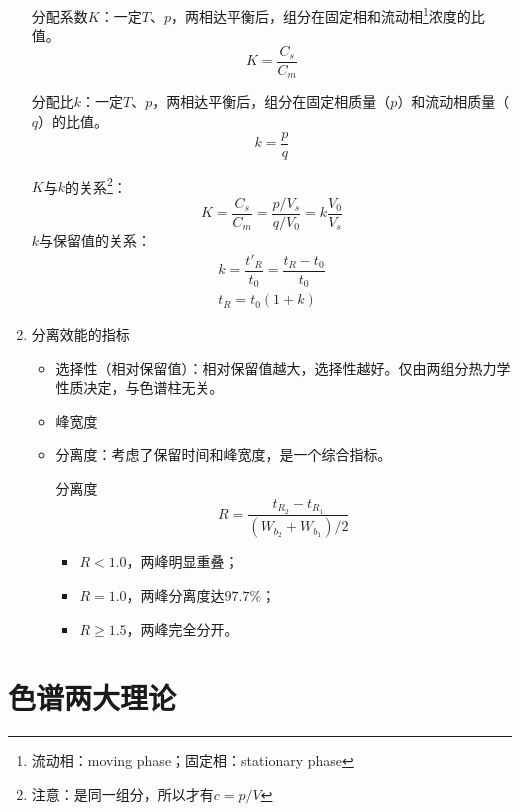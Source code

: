 \begin{enumerate}
	分配系数$K$：一定$T$、$p$，两相达平衡后，组分在固定相和流动相\footnote{流动相：moving phase；固定相：stationary phase}浓度的比值。	
	\begin{equation*}
		K=\dfrac{C_s}{C_m}
	\end{equation*}
	
		分配比$k$：一定$T$、$p$，两相达平衡后，组分在固定相质量（$p$）和流动相质量（$q$）的比值。
	\begin{equation*}
	k=\dfrac{p}{q}
	\end{equation*}
	
	$K$与$k$的关系\footnote{注意：是同一组分，所以才有$c=p/V$}：
	\begin{equation*}
	K=\dfrac{C_s}{C_m} =\dfrac{p/ V_s}{q/ V_0}=k \dfrac{V_0}{V_s}
	\end{equation*}
	$k$与保留值的关系：
	\begin{gather*}
		k=\dfrac{t'_R}{t_0} =\dfrac{t_R-t_0}{t_0}\\
		t_R=t_0 (1+k)		
	\end{gather*}
	
	\item 分离效能的指标
	\begin{itemize}
		\item 选择性（相对保留值）：相对保留值越大，选择性越好。仅由两组分热力学性质决定，与色谱柱无关。
		\item 峰宽度
		\item 分离度：考虑了保留时间和峰宽度，是一个综合指标。
		\begin{theorem*}{分离度}{}
			\begin{equation}
			R=\dfrac{t_{R_2}-t_{R_1}}{(W_{b_2}+W_{b_1})/2}\label{eqn:1.1}
			\end{equation}
		\end{theorem*}
		
				
		\begin{itemize}
			\item $R<1.0$，两峰明显重叠；
			\item $R=1.0$，两峰分离度达$97.7\%$；
			\item $R\geqslant 1.5$，两峰完全分开。
		\end{itemize}
	\end{itemize}
\end{enumerate}

\section{色谱两大理论}


